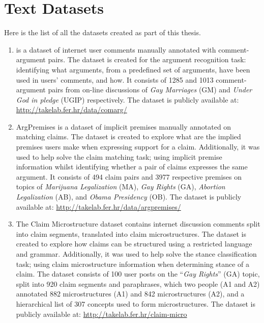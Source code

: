 \chapter{Text Datasets}
\label{chap:appendix_datasets}

Here is the list of all the datasets created as part of this thesis.

\begin{enumerate}[label=\textbf{A.\arabic*}]
\item\label{item:comarg} \ComArg is a dataset of internet user comments manually annotated with
comment-argument pairs. The dataset is created for the argument
recognition task: identifying what arguments, from a predefined
set of arguments, have been used in users' comments, and how.
It consists of 1285 and 1013 comment-argument pairs from 
on-line discussions of \emph{Gay Marriages} (GM) 
and \emph{Under God in pledge} (UGIP) respectively.
The dataset is publicly available at:
\url{http://takelab.fer.hr/data/comarg/}

\item\label{item:argpremises} ArgPremises is a dataset of 
implicit premises manually annotated on matching claims. 
The dataset is created to explore what are the implied premises users 
make when expressing support for a claim.
Additionally, it was used to help solve the claim matching task; 
using implicit premise information whilst 
identifying whether a pair of claims expresses the same argument. 
It consists of 494 claim pairs and 3977 respective premises on topics
of \emph{Marijuana Legalization} (MA), \emph{Gay Rights} (GA), 
\emph{Abortion Legalization} (AB),
and \emph{Obama Presidency} (OB).
The dataset is publicly available at:
\url{http://takelab.fer.hr/data/argpremises/}

\item\label{item:microstructures_dataset} 
The Claim Microstructure dataset contains internet
discussion comments split into claim
segments, translated into claim microstructures. The dataset is created
to explore how claims can be structured using a restricted
language and grammar. Additionally, it was used to help solve
the stance classification task; using claim microstructure
information when determining stance of a claim. 
The dataset consists of 
100 user posts on the ``\emph{Gay Rights}'' (GA) topic, 
split into 920 claim segments and paraphrases, which two people
(A1 and A2) annotated
882 microstructures (A1) and 842 microstructures (A2), and a hierarchical 
list of 307 concepts used to form microstructures. 
The dataset is publicly available at:
\url{http://takelab.fer.hr/claim-micro}


\end{enumerate}
